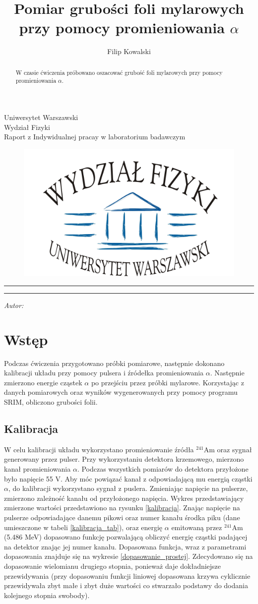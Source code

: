 \documentclass[12pt,a4paper]{article}
\author{Filip Kowalski }
\title{Pomiar grubości foli mylarowych przy pomocy promieniowania $\alpha$}
\makeatletter
\newcommand{\linia}{\rule{\linewidth}{0.4mm}}
\newcommand{\Ameryk}{${}^{241}_{}{}$Am }
\renewcommand{\maketitle}{\begin{titlepage}
    \vspace*{1cm}
    \begin{center}\small
    Uniwersytet Warszawski\\
    Wydział Fizyki\\
   Raport z Indywidualnej pracay w laboratorium badawczym
    \end{center}
    
\begin{figure}[h]
    \centering
    \includegraphics[scale=0.5]{logo.jpg}
    \end{figure}


    \vspace{3cm}
    \noindent\linia
    \begin{center}
      \LARGE \textsc{\@title}
         \end{center}
     \linia
    \vspace{0.5cm}
    \begin{flushright}
    \begin{minipage}{5cm}
    \textit{\small Autor:}\\
    \normalsize \textsc{\@author} \par
    \end{minipage}
    \vspace{5cm}
    
     \end{flushright}
    \vspace*{\stretch{6}}
    \begin{center}
    \@date
    \end{center}
         \end{titlepage}}
\makeatother
\begin{document}
\maketitle
\begin{abstract}
W czasie ćwiczenia próbowano oszacować grubość foli mylarowych przy pomocy promieniowania $\alpha$. 
\end{abstract}
\section{Wstęp}
Podczas ćwiczenia przygotowano próbki pomiarowe, następnie dokonano kalibracji układu przy pomocy pulsera i źródełka promieniowania $\alpha$. Następnie zmierzono energie cząstek $\alpha$ po przejściu przez próbki mylarowe. Korzystając z danych pomiarowych oraz wyników wygenerowanych przy pomocy programu SRIM, obliczono grubości folii.

\subsection{Kalibracja}
W celu kalibracji układu wykorzystano promieniowanie źródła \Ameryk oraz sygnał generowany przez pulser. Przy wykorzystaniu detektora krzemowego, mierzono kanał promieniowania $\alpha$. Podczas wszystkich pomiarów do detektora przyłożone było napięcie 55 V. Aby móc powiązać kanał z odpowiadającą mu energią cząstki $\alpha$, do kalibracji wykorzystano sygnał z puslera. Zmieniając napięcie  na pulserze, zmierzono zależność kanału od przyłożonego napięcia. Wykres przedstawiający zmierzone wartości przedstawiono na rysunku \ref{kalibracja}. Znając napięcie na pulserze odpowiadające danemu pikowi oraz numer kanału środka piku (dane umieszczone w tabeli \ref{kalibracja_tab}), oraz energię $\alpha$ emitowaną przez \Ameryk  (5.486 MeV) dopasowano funkcję pozwalającą obliczyć energię cząstki padającej na detektor znając jej numer kanału. Dopasowana funkcja, wraz z parametrami dopasowania znajduje się na wykresie \ref{dopasowanie_prostej}. Zdecydowano się na dopasowanie wielomianu drugiego stopnia, ponieważ daje dokładniejsze przewidywania (przy dopasowaniu funkcji liniowej dopasowana krzywa cyklicznie przewidywała zbyt małe i zbyt duże wartości co stwarzało podstawy do dodania kolejnego stopnia swobody). 
\end{document}
